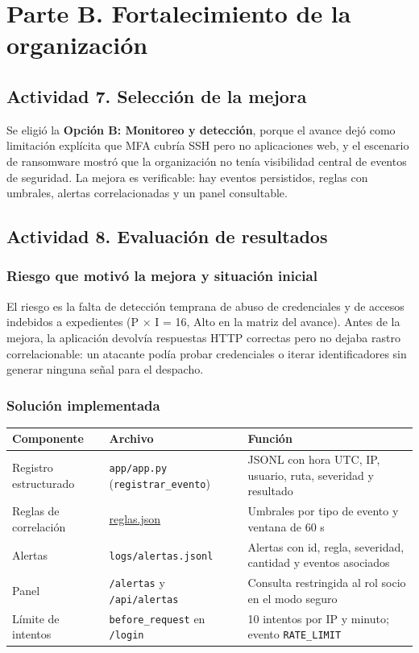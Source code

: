 \documentclass[letterpaper]{article}
\begin{document}
\section{Parte B. Fortalecimiento de la organización}
\label{sec:org62ea99e}

\subsection{Actividad 7. Selección de la mejora}
\label{sec:orgfb903a8}

Se eligió la \textbf{Opción B: Monitoreo y detección}, porque el avance dejó como limitación
explícita que MFA cubría SSH pero no aplicaciones web, y el escenario de ransomware
mostró que la organización no tenía visibilidad central de eventos de seguridad.
La mejora es verificable: hay eventos persistidos, reglas con umbrales, alertas
correlacionadas y un panel consultable.
\subsection{Actividad 8. Evaluación de resultados}
\label{sec:org035b40e}

\subsubsection{Riesgo que motivó la mejora y situación inicial}
\label{sec:orge9251d2}

El riesgo es la falta de detección temprana de abuso de credenciales y de accesos
indebidos a expedientes (P × I = 16, Alto en la matriz del avance). Antes de la mejora,
la aplicación devolvía respuestas HTTP correctas pero no dejaba rastro correlacionable:
un atacante podía probar credenciales o iterar identificadores sin generar ninguna
señal para el despacho.
\subsubsection{Solución implementada}
\label{sec:orga9a6b66}

\begin{center}
\begin{tabular}{lll}
Componente & Archivo & Función\\
\hline
Registro estructurado & \texttt{app/app.py} (\texttt{registrar\_evento}) & JSONL con hora UTC, IP, usuario, ruta, severidad y resultado\\
Reglas de correlación & \href{lab/monitoreo/reglas.json}{reglas.json} & Umbrales por tipo de evento y ventana de 60 s\\
Alertas & \texttt{logs/alertas.jsonl} & Alertas con id, regla, severidad, cantidad y eventos asociados\\
Panel & \texttt{/alertas} y \texttt{/api/alertas} & Consulta restringida al rol socio en el modo seguro\\
Límite de intentos & \texttt{before\_request} en \texttt{/login} & 10 intentos por IP y minuto; evento \texttt{RATE\_LIMIT}\\
\end{tabular}
\end{center}
\end{document}
